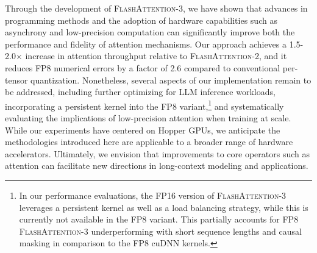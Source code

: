 Through the development of \textsc{FlashAttention-3}, we have shown that advances in programming methods and the adoption of hardware capabilities such as asynchrony and low-precision computation can significantly improve both the performance and fidelity of attention mechanisms. Our approach achieves a 1.5-2.0$\times$ increase in attention throughput relative to \textsc{FlashAttention-2}, and it reduces FP8 numerical errors by a factor of 2.6 compared to conventional per-tensor quantization. Nonetheless, several aspects of our implementation remain to be addressed, including further optimizing for LLM inference workloads, incorporating a persistent kernel into the FP8 variant,\footnote{In our performance evaluations, the FP16 version of \textsc{FlashAttention-3} leverages a persistent kernel as well as a load balancing strategy, while this is currently not available in the FP8 variant. This partially accounts for FP8 \textsc{FlashAttention-3} underperforming with short sequence lengths and causal masking in comparison to the FP8 cuDNN kernels.} and systematically evaluating the implications of low-precision attention when training at scale. While our experiments have centered on Hopper GPUs, we anticipate the methodologies introduced here are applicable to a broader range of hardware accelerators. Ultimately, we envision that improvements to core operators such as attention can facilitate new directions in long-context modeling and applications.

